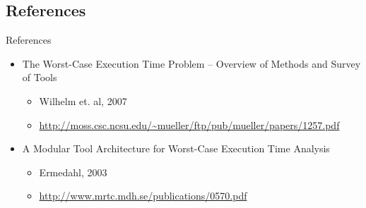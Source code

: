 \documentclass{beamer}
\begin{document}
\subsection{References}
\begin{frame}{References}
  \begin{itemize}
    \item The Worst-Case Execution Time Problem -- Overview of Methods and Survey of Tools
      \begin{itemize}
        \item Wilhelm et. al, 2007
        \item \url{http://moss.csc.ncsu.edu/\~mueller/ftp/pub/mueller/papers/1257.pdf}
      \end{itemize}
    \item A Modular Tool Architecture for Worst-Case Execution Time Analysis
      \begin{itemize}
        \item Ermedahl, 2003
        \item \url{http://www.mrtc.mdh.se/publications/0570.pdf}
      \end{itemize}
  \end{itemize}
\end{frame}
\end{document}
